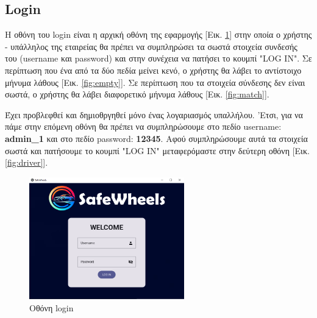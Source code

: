 \documentclass{llncs}
\begin{document}
\subsection{Login}
Η οθόνη του login είναι η αρχική οθόνη της εφαρμογής [Εικ. \ref{fig:login}] στην οποία ο χρήστης - υπάλληλος της εταιρείας θα πρέπει να συμπληρώσει τα σωστά στοιχεία συνδεσής του (username και password) και στην συνέχεια να πατήσει το κουμπί "LOG IN". Σε περίπτωση που ένα από τα δύο πεδία μείνει κενό, ο χρήστης θα λάβει το αντίστοιχο μήνυμα λάθους [Εικ. \ref{fig:empty}].
Σε περίπτωση που τα στοιχεία σύνδεσης δεν είναι σωστά, ο χρήστης θα λάβει διαφορετικό μήνυμα λάθους [Εικ. \ref{fig:match}].

Έχει προβλεφθεί και δημιοθργηθεί μόνο ένας λογαριασμός υπαλλήλου. 'Ετσι, για να πάμε στην επόμενη οθόνη θα πρέπει να συμπληρώσουμε στο πεδίο username: \textbf{admin\_1} και στο πεδίο password: \textbf{12345}. Αφού συμπληρώσουμε αυτά τα στοιχεία σωστά και πατήσουμε το κουμπί "LOG IN" μεταφερόμαστε στην δεύτερη οθόνη [Εικ. \ref{fig:driver}].
\begin{figure}
    \begin{center}
        \includegraphics[width=0.6\textwidth]{images/login.png}
    \end{center}
    \caption{Οθόνη login} 
    \label{fig:login}   
\end{figure}
\end{document}
